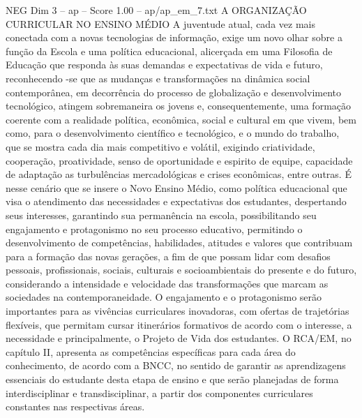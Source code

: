 \begin{textsample}{NEG Dim 3 – ap – Score 1.00 – ap/ap\_em\_7.txt}  \label{ex:f3_neg_108}
A ORGANIZAÇÃO CURRICULAR NO ENSINO MÉDIO A juventude atual, cada vez mais conectada com a novas tecnologias de informação, exige um novo olhar sobre a função da Escola e uma política educacional, alicerçada em uma Filosofia de Educação que responda às suas demandas e expectativas de vida e futuro, reconhecendo -se que as mudanças e transformações na dinâmica social contemporânea, em decorrência do processo de globalização e desenvolvimento tecnológico, atingem sobremaneira os jovens e, consequentemente, uma formação coerente com a realidade política, econômica, social e cultural em que vivem, bem como, para o desenvolvimento científico e tecnológico, e o mundo do trabalho, que se mostra cada dia mais competitivo e volátil, exigindo criatividade, cooperação, proatividade, senso de oportunidade e espirito de equipe, capacidade de adaptação as turbulências mercadológicas e crises econômicas, entre outras.
É nesse cenário que se insere o Novo Ensino Médio, como política educacional que visa o atendimento das necessidades e expectativas dos estudantes, despertando seus interesses, garantindo sua permanência na escola, possibilitando seu engajamento e protagonismo no seu processo educativo, permitindo o desenvolvimento de competências, habilidades, atitudes e valores que contribuam para a formação das novas gerações, a fim de que possam lidar com desafios pessoais, profissionais, sociais, culturais e socioambientais do presente e do futuro, considerando a intensidade e velocidade das transformações que marcam as sociedades na contemporaneidade.
O engajamento e o protagonismo serão importantes para as vivências curriculares inovadoras, com ofertas de trajetórias flexíveis, que permitam cursar itinerários formativos de acordo com o interesse, a necessidade e principalmente, o Projeto de Vida dos estudantes.
O RCA/EM, no capítulo II, apresenta as competências específicas para cada área do conhecimento, de acordo com a BNCC, no sentido de garantir as aprendizagens essenciais do estudante desta etapa de ensino e que serão planejadas de forma interdisciplinar e transdisciplinar, a partir dos componentes curriculares constantes nas respectivas áreas.

\end{textsample}
